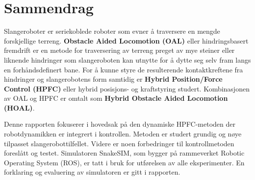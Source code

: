 \chapter{Sammendrag}




Slangeroboter er seriekoblede roboter som evner å traversere en mengde forskjellige terreng. \textbf{Obstacle Aided Locomotion (OAL)} eller hindringsbasert fremdrift er en metode for traversering av terreng preget av mye steiner eller liknende hindringer som slangeroboten kan utnytte for å dytte seg selv fram langs en forhåndsdefinert bane. For å kunne styre de resulterende kontaktkreftene fra hindringer og slangerobotens form samtidig er \textbf{Hybrid Position/Force Control (HPFC)} eller hybrid posisjons- og kraftstyring studert. Kombinasjonen av OAL og HPFC er omtalt som \textbf{Hybrid Obstacle Aided Locomotion (HOAL)}.

Denne rapporten fokuserer i hovedsak på den dynamiske HPFC-metoden der robotdynamikken er integrert i kontrollen. Metoden er studert grundig og nøye tilpasset slangerobottilfellet. Videre er noen forbedringer til kontrollmetoden foreslått og testet.
Simulatoren SnakeSIM, som bygger på rammeverket Robotic Operating System (ROS), er tatt i bruk for utførelsen av alle eksperimenter. En forklaring og evaluering av simulatoren er gitt i rapporten.


